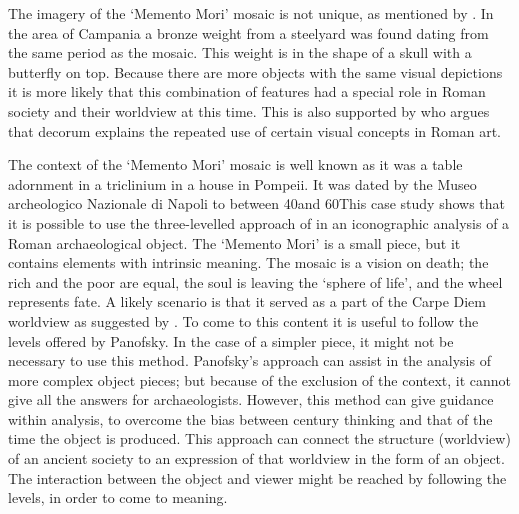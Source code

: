 The imagery of the ‘Memento Mori’ mosaic is not unique, as mentioned by \textcite[99--100] {Cuomo_2007}. 
In the area of Campania a bronze weight from a steelyard was found dating from the same period as the mosaic. 
This weight is in the shape of a skull with a butterfly on top. Because there are more objects with the same visual depictions it is more likely that this combination of features had a special role in Roman society and their worldview at this time. 
This is also supported by \textcite{Perry_2005}  who argues that decorum explains the repeated use of certain visual concepts in Roman art. 
	
The context of the ‘Memento Mori’ mosaic is well known as it was a table adornment in a triclinium in a house in Pompeii. It was dated by the Museo archeologico Nazionale di Napoli to between 40\AD and 60\AD This case study shows that it is possible to use the three-levelled approach of \textcite{Panofsky_1939}  in an iconographic analysis of a Roman archaeological object. The ‘Memento Mori’ is a small piece, but it contains elements with intrinsic meaning. The mosaic is a vision on death; the rich and the poor are equal, the soul is leaving the ‘sphere of life’, and the wheel represents fate. A likely scenario is that it served as a part of the Carpe Diem worldview as suggested by \textcite {Hope_2009}. To come to this content it is useful to follow the levels offered by Panofsky. 
In the case of a simpler piece, it might not be necessary to use this method. Panofsky’s approach can assist in the analysis of more complex object pieces; but because of the exclusion of the context, it cannot give all the answers for archaeologists. However, this method can give guidance within analysis, to overcome the bias between  century thinking and that of the time the object is produced. 
This approach can connect the structure (worldview) of an ancient society to an expression of that worldview in the form of an object. The interaction between the object and viewer might be reached by following the levels, in order to come to meaning.

